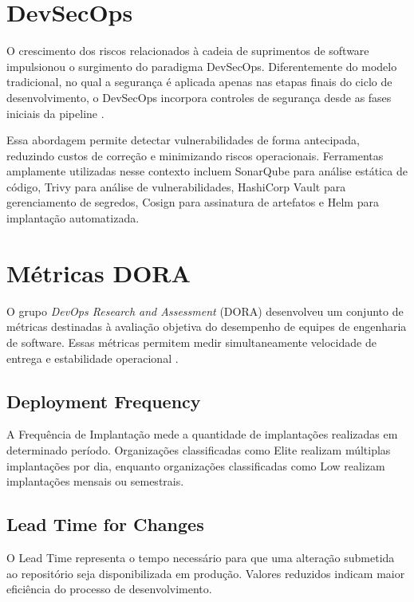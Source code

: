 \section{DevSecOps}
\label{sec:devsecops}

O crescimento dos riscos relacionados à cadeia de suprimentos de software impulsionou o surgimento do paradigma DevSecOps. Diferentemente do modelo tradicional, no qual a segurança é aplicada apenas nas etapas finais do ciclo de desenvolvimento, o DevSecOps incorpora controles de segurança desde as fases iniciais da pipeline \cite{cyberark2024,appsec2024}.

Essa abordagem permite detectar vulnerabilidades de forma antecipada, reduzindo custos de correção e minimizando riscos operacionais. Ferramentas amplamente utilizadas nesse contexto incluem SonarQube para análise estática de código, Trivy para análise de vulnerabilidades, HashiCorp Vault para gerenciamento de segredos, Cosign para assinatura de artefatos e Helm para implantação automatizada.

\section{Métricas DORA}
\label{sec:metricas-dora}

O grupo \textit{DevOps Research and Assessment} (DORA) desenvolveu um conjunto de métricas destinadas à avaliação objetiva do desempenho de equipes de engenharia de software. Essas métricas permitem medir simultaneamente velocidade de entrega e estabilidade operacional \cite{dora2024,dx2024}.

\subsection{Deployment Frequency}
\label{subsec:deployment-frequency}

A Frequência de Implantação mede a quantidade de implantações realizadas em determinado período. Organizações classificadas como Elite realizam múltiplas implantações por dia, enquanto organizações classificadas como Low realizam implantações mensais ou semestrais.

\subsection{Lead Time for Changes}
\label{subsec:lead-time}

O Lead Time representa o tempo necessário para que uma alteração submetida ao repositório seja disponibilizada em produção. Valores reduzidos indicam maior eficiência do processo de desenvolvimento.

